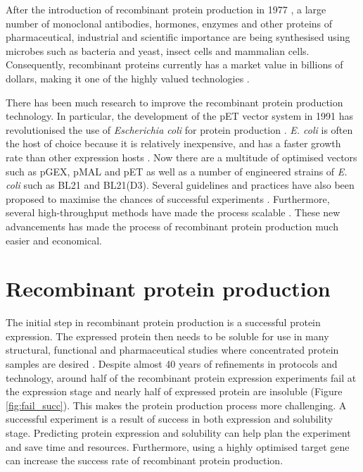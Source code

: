 After the introduction of recombinant protein production in 1977 \cite{itakura1977expression}, a large number of monoclonal antibodies, hormones, enzymes and other proteins of pharmaceutical, industrial and scientific importance are being synthesised using microbes such as bacteria and yeast, insect cells and mammalian cells. Consequently, recombinant proteins currently has a market value in billions of dollars, making it one of the highly valued technologies \cite{walsh2014biopharmaceutical, puetz2019recombinant}. 


There has been much research to improve the recombinant protein production technology. In particular, the development of the pET vector system in 1991 has revolutionised the use of \textit{Escherichia coli} for protein production \cite{dubendorf1991controlling}. \textit{E. coli} is often the host of choice because it is relatively inexpensive, and has a faster growth rate than other expression hosts \cite{Rosano2014-oq, demain2009production}. Now there are a multitude of optimised vectors such as pGEX, pMAL and pET as well as a number of engineered strains of \textit{E. coli} such as BL21 and BL21(D3). Several guidelines and practices have also been proposed to maximise the chances of successful experiments \cite{Berlec2013-mb, Rosano2014-oq}. Furthermore, several high-throughput methods have made the process scalable \cite{stevens2000design, braun2003high, jia2016high}. These new advancements has made the process of recombinant protein production much easier and economical. 


\section{Recombinant protein production}
The initial step in recombinant protein production is a successful protein expression. The expressed protein then needs to be soluble for use in many structural, functional and pharmaceutical studies where concentrated protein samples are desired \cite{Kramer2012-wk, Hou2018-yd}. Despite almost 40 years of refinements in protocols and technology, around half of the recombinant protein expression experiments fail at the expression stage and nearly half of expressed protein are insoluble \cite{targetdbmetrices} (Figure \ref{fig:fail_succ}). This makes the protein production process more challenging. A successful experiment is a result of success in both expression and solubility stage. Predicting protein expression and solubility can help plan the experiment and save time and resources. Furthermore, using a highly optimised target gene can increase the success rate of recombinant protein production.


